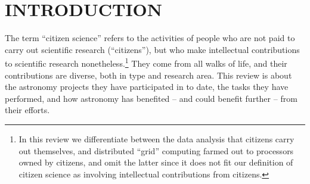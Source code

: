 \documentclass{ar2e}
\begin{document}
\maketitle


\section{INTRODUCTION}
\label{sec:intro}

The term ``citizen science'' refers to the activities of people who are not paid
to carry out scientific research (``citizens''), but who make intellectual
contributions to scientific research nonetheless.\footnote{In this review we
differentiate between the data analysis that citizens carry out themselves, and
distributed ``grid'' computing farmed out to processors owned by citizens, and
omit the latter since it does not fit our definition of citizen science as
involving intellectual  contributions from citizens.} They come from all walks
of life, and their contributions are diverse, both in type and research area.
This review is about the astronomy projects they have participated in to date,
the tasks they have performed, and how astronomy has benefited -- and could
benefit further -- from their efforts.
\end{document}
